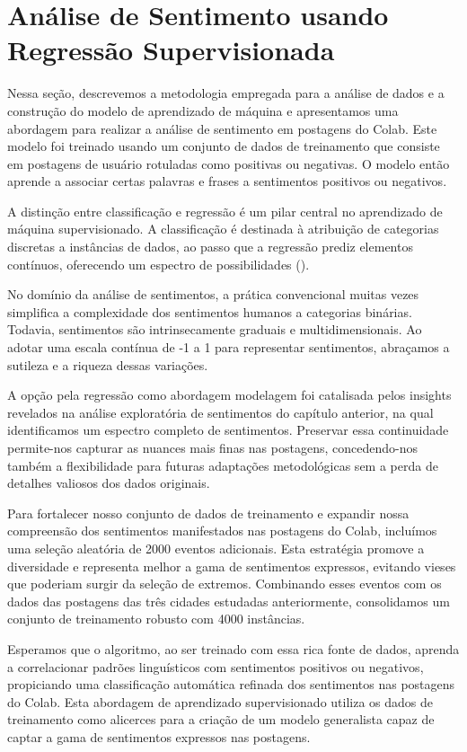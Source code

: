 \section{Análise de Sentimento usando Regressão Supervisionada}

Nessa seção, descrevemos a metodologia empregada para a análise de dados e a construção do modelo de aprendizado de máquina e apresentamos uma abordagem para realizar a análise de sentimento em postagens do Colab. Este modelo foi treinado usando um conjunto de dados de treinamento que consiste em postagens de usuário rotuladas como positivas ou negativas. O modelo então aprende a associar certas palavras e frases a sentimentos positivos ou negativos.

A distinção entre classificação e regressão é um pilar central no aprendizado de máquina supervisionado. A classificação é destinada à atribuição de categorias discretas a instâncias de dados, ao passo que a regressão prediz elementos contínuos, oferecendo um espectro de possibilidades ().

No domínio da análise de sentimentos, a prática convencional muitas vezes simplifica a complexidade dos sentimentos humanos a categorias binárias. Todavia, sentimentos são intrinsecamente graduais e multidimensionais. Ao adotar uma escala contínua de -1 a 1 para representar sentimentos, abraçamos a sutileza e a riqueza dessas variações.

A opção pela regressão como abordagem modelagem foi catalisada pelos insights revelados na análise exploratória de sentimentos do capítulo anterior, na qual identificamos um espectro completo de sentimentos. Preservar essa continuidade permite-nos capturar as nuances mais finas nas postagens, concedendo-nos também a flexibilidade para futuras adaptações metodológicas sem a perda de detalhes valiosos dos dados originais.

Para fortalecer nosso conjunto de dados de treinamento e expandir nossa compreensão dos sentimentos manifestados nas postagens do Colab, incluímos uma seleção aleatória de 2000 eventos adicionais. Esta estratégia promove a diversidade e representa melhor a gama de sentimentos expressos, evitando vieses que poderiam surgir da seleção de extremos. Combinando esses eventos com os dados das postagens das três cidades estudadas anteriormente, consolidamos um conjunto de treinamento robusto com 4000 instâncias.

Esperamos que o algoritmo, ao ser treinado com essa rica fonte de dados, aprenda a correlacionar padrões linguísticos com sentimentos positivos ou negativos, propiciando uma classificação automática refinada dos sentimentos nas postagens do Colab. Esta abordagem de aprendizado supervisionado utiliza os dados de treinamento como alicerces para a criação de um modelo generalista capaz de captar a gama de sentimentos expressos nas postagens.

